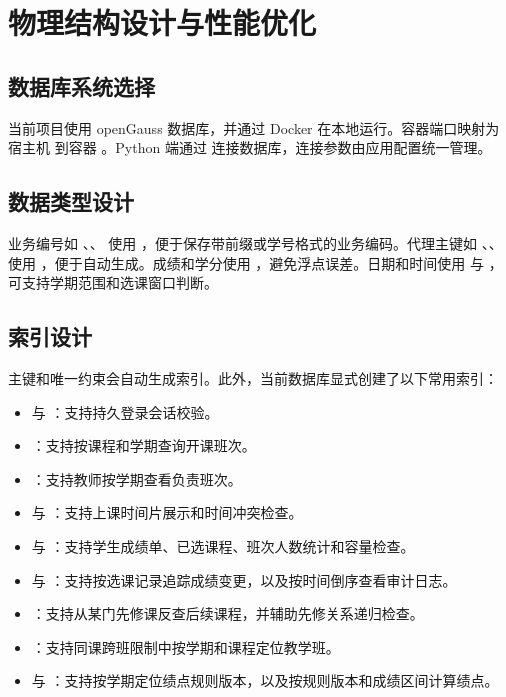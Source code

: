 \chapter{物理结构设计与性能优化}

\section{数据库系统选择}

当前项目使用 openGauss 数据库，并通过 Docker 在本地运行。容器端口映射为宿主机  到容器 。Python 端通过  连接数据库，连接参数由应用配置统一管理。


\section{数据类型设计}

业务编号如 、、 使用 ，便于保存带前缀或学号格式的业务编码。代理主键如 、、 使用 ，便于自动生成。成绩和学分使用 ，避免浮点误差。日期和时间使用  与 ，可支持学期范围和选课窗口判断。

\section{索引设计}

主键和唯一约束会自动生成索引。此外，当前数据库显式创建了以下常用索引：

\begin{itemize}
  \item {} 与 ：支持持久登录会话校验。
  \item {}：支持按课程和学期查询开课班次。
  \item {}：支持教师按学期查看负责班次。
  \item {} 与 ：支持上课时间片展示和时间冲突检查。
  \item {} 与 ：支持学生成绩单、已选课程、班次人数统计和容量检查。
  \item {} 与 ：支持按选课记录追踪成绩变更，以及按时间倒序查看审计日志。
  \item {}：支持从某门先修课反查后续课程，并辅助先修关系递归检查。
  \item {}：支持同课跨班限制中按学期和课程定位教学班。
  \item {} 与 ：支持按学期定位绩点规则版本，以及按规则版本和成绩区间计算绩点。
\end{itemize}

